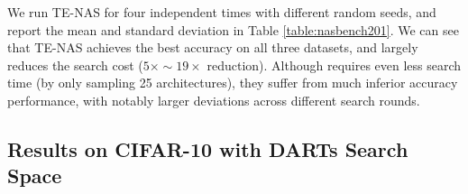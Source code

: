 \documentclass{article} \usepackage{iclr2021_conference,times}
\begin{document}
We run TE-NAS for four independent times with different random seeds, and report the mean and standard deviation in Table \ref{table:nasbench201}. We can see that TE-NAS achieves the best accuracy on all three datasets, and largely reduces the search cost ($5\times \sim 19\times$ reduction).
Although \citet{mellor2020neural} requires even less search time (by only sampling 25 architectures), they suffer from much inferior accuracy performance, with notably larger deviations across different search rounds.


\vspace{-0.5em}
\subsection{Results on CIFAR-10 with DARTs Search Space}\label{sec:cifar10}
\end{document}
